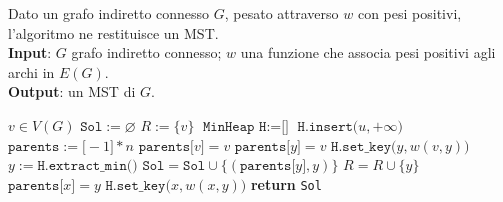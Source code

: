 \documentclass[14pt]{extreport}
\theoremstyle{definition}
\theoremstyle{definition}
\begin{document}
\begin{algorithm}[H]
    \caption{
        Dato un grafo indiretto connesso $G$, pesato attraverso $w$ con pesi positivi, l'algoritmo ne restituisce un MST.\\
        \textbf{Input}: $G$ grafo indiretto connesso; $w$ una funzione che associa pesi positivi agli archi in $E(G)$.\\
        \textbf{Output}: un MST di $G$.
    }

    \begin{algorithmic}[1]
            \State $v \in V(G)$
            \State $\texttt{Sol} := \varnothing$
            \State $R := \{v\}$
            \State $\texttt{MinHeap H} := \texttt{[]}$
                \State $\texttt{H.insert(}u, +\infty\texttt{)}$
            \EndFor
            \State $\texttt{parents} := \texttt{[}-1\texttt{]} * n$
            \State $\texttt{parents[}v\texttt{]} = v$
                \State $\texttt{parents[}y\texttt{]} = v$
                \State $\texttt{H.set\_key(}y, w(v, y)\texttt{)}$
            \EndFor
                \State $y := \texttt{H.extract\_min()}$ 
                    \State $\texttt{Sol} = \texttt{Sol} \cup \{ (\texttt{parents[}y\texttt{]}, y) \}$
                \State $R = R \cup \{y\}$
                        \State $\texttt{parents[}x\texttt{]} = y$
                        \State $\texttt{H.set\_key(}x, w(x, y)\texttt{)}$
                    \EndIf
                \EndFor
            \EndWhile
            \State \textbf{return} \texttt{Sol}
        \EndFunction
    \end{algorithmic}
\end{algorithm}
\end{document}
